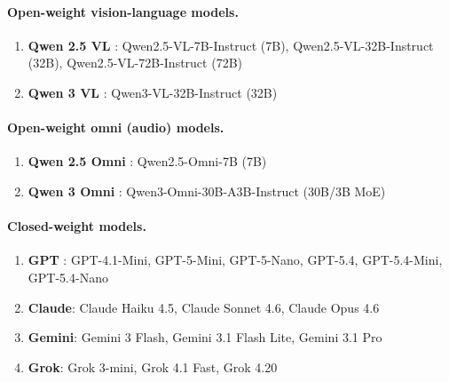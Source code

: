 \paragraph{Open-weight vision-language models.}
\begin{enumerate}
    \item \textbf{Qwen 2.5 VL} \citep{Bai2025Qwen25VLTR}: Qwen2.5-VL-7B-Instruct (7B), Qwen2.5-VL-32B-Instruct (32B), Qwen2.5-VL-72B-Instruct (72B)
    \item \textbf{Qwen 3 VL} \citep{bai2025qwen3}: Qwen3-VL-32B-Instruct (32B)
\end{enumerate}

\paragraph{Open-weight omni (audio) models.}
\begin{enumerate}
    \item \textbf{Qwen 2.5 Omni} \citep{Xu2025Qwen25OmniTR}: Qwen2.5-Omni-7B (7B)
    \item \textbf{Qwen 3 Omni} \citep{xu2025qwen3}: Qwen3-Omni-30B-A3B-Instruct (30B/3B MoE)
\end{enumerate}

\paragraph{Closed-weight models.}
\begin{enumerate}
    \item \textbf{GPT} \citep{singh2025openai}: GPT-4.1-Mini, GPT-5-Mini, GPT-5-Nano, GPT-5.4, GPT-5.4-Mini, GPT-5.4-Nano
    \item \textbf{Claude}: Claude Haiku 4.5, Claude Sonnet 4.6, Claude Opus 4.6
    \item \textbf{Gemini}: Gemini 3 Flash, Gemini 3.1 Flash Lite, Gemini 3.1 Pro
    \item \textbf{Grok}: Grok 3-mini, Grok 4.1 Fast, Grok 4.20
\end{enumerate}

\clearpage
